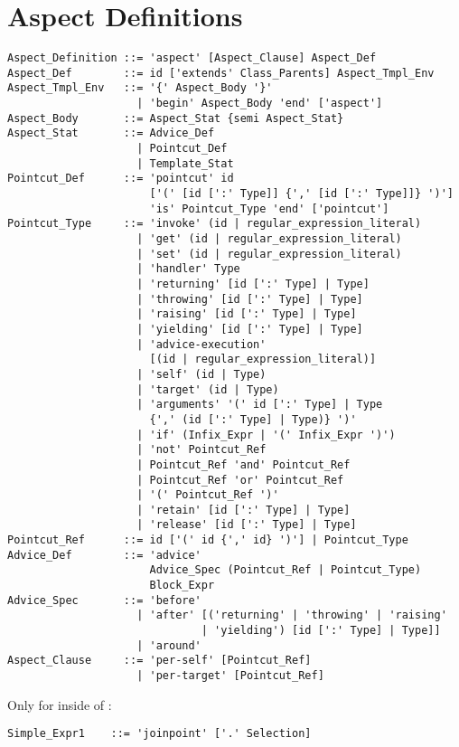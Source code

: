 \section{Aspect Definitions}
\label{sec:aspects}

\syntax\begin{lstlisting}
Aspect_Definition ::= 'aspect' [Aspect_Clause] Aspect_Def
Aspect_Def        ::= id ['extends' Class_Parents] Aspect_Tmpl_Env
Aspect_Tmpl_Env   ::= '{' Aspect_Body '}'
                    | 'begin' Aspect_Body 'end' ['aspect']
Aspect_Body       ::= Aspect_Stat {semi Aspect_Stat}
Aspect_Stat       ::= Advice_Def
                    | Pointcut_Def
                    | Template_Stat
Pointcut_Def      ::= 'pointcut' id
                      ['(' [id [':' Type]] {',' [id [':' Type]]} ')']
                      'is' Pointcut_Type 'end' ['pointcut']
Pointcut_Type     ::= 'invoke' (id | regular_expression_literal)
                    | 'get' (id | regular_expression_literal)
                    | 'set' (id | regular_expression_literal)
                    | 'handler' Type
                    | 'returning' [id [':' Type] | Type]
                    | 'throwing' [id [':' Type] | Type]
                    | 'raising' [id [':' Type] | Type]
                    | 'yielding' [id [':' Type] | Type]
                    | 'advice-execution' 
                      [(id | regular_expression_literal)]
                    | 'self' (id | Type)
                    | 'target' (id | Type)
                    | 'arguments' '(' id [':' Type] | Type 
                      {',' (id [':' Type] | Type)} ')'
                    | 'if' (Infix_Expr | '(' Infix_Expr ')')
                    | 'not' Pointcut_Ref
                    | Pointcut_Ref 'and' Pointcut_Ref
                    | Pointcut_Ref 'or' Pointcut_Ref
                    | '(' Pointcut_Ref ')'
                    | 'retain' [id [':' Type] | Type]
                    | 'release' [id [':' Type] | Type]
Pointcut_Ref      ::= id ['(' id {',' id} ')'] | Pointcut_Type
Advice_Def        ::= 'advice' 
                      Advice_Spec (Pointcut_Ref | Pointcut_Type)
                      Block_Expr
Advice_Spec       ::= 'before' 
                    | 'after' [('returning' | 'throwing' | 'raising'
                              | 'yielding') [id [':' Type] | Type]]
                    | 'around'
Aspect_Clause     ::= 'per-self' [Pointcut_Ref] 
                    | 'per-target' [Pointcut_Ref] 
\end{lstlisting}

Only for  inside of :
\begin{lstlisting}
Simple_Expr1    ::= 'joinpoint' ['.' Selection]
\end{lstlisting}


